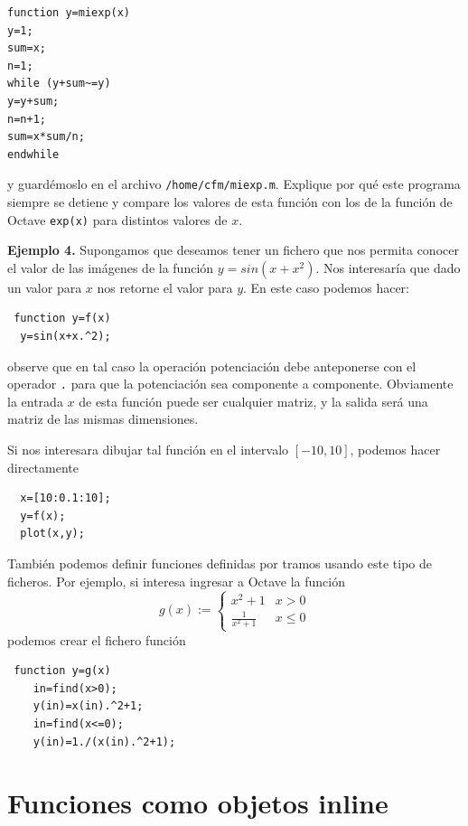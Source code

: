\documentclass[letter,11pt]{article}
\newcommand\0{\mathbf{0}}
\newcommand{\octave}{{\sc Octave }}
\begin{document}
\begin{lstlisting}			
function y=miexp(x)
y=1;
sum=x;
n=1;
while (y+sum~=y)
y=y+sum;
n=n+1;
sum=x*sum/n;
endwhile
\end{lstlisting}

\medskip

y guard\'emoslo en el archivo \Verb+/home/cfm/miexp.m+. Explique por qu\'e este programa siempre se detiene y compare los valores de esta funci\'on con los de la funci\'on de \octave  \texttt{exp(x)} para distintos valores de $x$.

\medskip
\textbf{Ejemplo 4.} 
Supongamos que deseamos tener un fichero que nos permita conocer el valor de las im\'agenes de la funci\'on 
$y=sin(x+x^2)$. Nos interesar\'ia que dado un valor para $x$ nos retorne el valor para $y$. En este caso podemos hacer:
\begin{verbatim}
 function y=f(x)
  y=sin(x+x.^2);
\end{verbatim}
observe que en tal caso la operaci\'on potenciaci\'on debe anteponerse con el operador \texttt{.} para que la 
potenciaci\'on sea componente a componente. Obviamente la entrada $x$ de esta funci\'on puede ser cualquier matriz, y 
la salida ser\'a una matriz de las mismas dimensiones.

Si nos interesara dibujar tal funci\'on en el intervalo $[-10,10]$, podemos hacer 
directamente
\begin{verbatim}
  x=[10:0.1:10];
  y=f(x);
  plot(x,y);
\end{verbatim}

Tambi\'en podemos definir funciones definidas por tramos usando este tipo de ficheros. Por ejemplo, si 
interesa ingresar a \octave la funci\'on 
$$
g(x):=\begin{cases}
       x^2+1 		&  x>0	\\
       \frac{1}{x^2+1} & x\leq 0
      \end{cases}
$$
podemos crear el fichero funci\'on
\begin{verbatim}
 function y=g(x)
    in=find(x>0);
    y(in)=x(in).^2+1;
    in=find(x<=0);
    y(in)=1./(x(in).^2+1);
\end{verbatim}

\section{Funciones como objetos inline}
\end{document}
